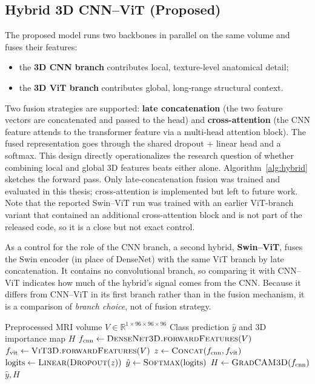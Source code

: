 \subsection{Hybrid 3D CNN--ViT (Proposed)}
The proposed model runs two backbones in parallel on the same volume and fuses their features:
\begin{itemize}
    \item the \textbf{3D CNN branch} contributes local, texture-level anatomical detail;
    \item the \textbf{3D ViT branch} contributes global, long-range structural context.
\end{itemize}
Two fusion strategies are supported: \textbf{late concatenation} (the two feature vectors are concatenated and passed to the head) and \textbf{cross-attention} (the CNN feature attends to the transformer feature via a multi-head attention block). The fused representation goes through the shared dropout + linear head and a softmax. This design directly operationalizes the research question of whether combining local and global 3D features beats either alone. Algorithm~\ref{alg:hybrid} sketches the forward pass. Only late-concatenation fusion was trained and evaluated in this thesis; cross-attention is implemented but left to future work. Note that the reported Swin--ViT run was trained with an earlier ViT-branch variant that contained an additional cross-attention block and is not part of the released code, so it is a close but not exact control.

As a control for the role of the CNN branch, a second hybrid, \textbf{Swin--ViT}, fuses the Swin encoder (in place of DenseNet) with the same ViT branch by late concatenation. It contains no convolutional branch, so comparing it with CNN--ViT indicates how much of the hybrid's signal comes from the CNN. Because it differs from CNN--ViT in its first branch rather than in the fusion mechanism, it is a comparison of \emph{branch choice}, not of fusion strategy.

\begin{algorithm}[H]
\caption{Hybrid 3D CNN--ViT classification (late-concat fusion)}
\label{alg:hybrid}
\begin{algorithmic}[1]
\Require Preprocessed MRI volume $V \in \mathbb{R}^{1\times96\times96\times96}$
\Ensure Class prediction $\hat{y}$ and 3D importance map $H$
\State $f_{\text{cnn}} \gets \textsc{DenseNet3D.forwardFeatures}(V)$ 
\State $f_{\text{vit}} \gets \textsc{ViT3D.forwardFeatures}(V)$ 
\State $z \gets \textsc{Concat}(f_{\text{cnn}}, f_{\text{vit}})$
\State $\text{logits} \gets \textsc{Linear}(\textsc{Dropout}(z))$
\State $\hat{y} \gets \textsc{Softmax}(\text{logits})$
\State $H \gets \textsc{GradCAM3D}(f_{\text{cnn}})$ 
\State \Return $\hat{y}, H$
\end{algorithmic}
\end{algorithm}

